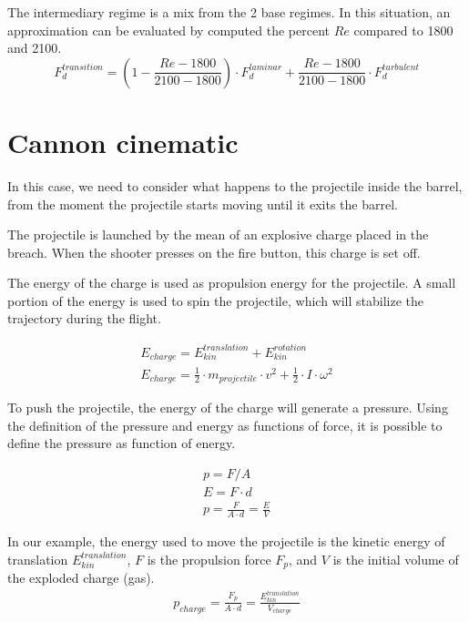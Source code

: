 \documentclass[12pt,a4paper]{article}
\begin{document}
The intermediary regime is a mix from the 2 base regimes. In this situation, an approximation can be evaluated by computed the percent $Re$ compared to 1800 and 2100. 
\begin{equation}
	F_d^{transition} = (1- \frac{Re - 1800}{2100-1800}) \cdot F_d^{laminar} + \frac{Re - 1800}{2100-1800} \cdot F_d^{turbulent}
\end{equation}

\section{Cannon cinematic}
In this case, we need to consider what happens to the projectile inside the barrel, from the moment the projectile starts moving until it exits the barrel. 

The projectile is launched by the mean of an explosive charge placed in the breach. 
When the shooter presses on the fire button, this charge is set off. 

The energy of the charge is used as propulsion energy for the projectile. A small portion of the energy is used to spin the projectile, which will stabilize the trajectory during the flight. 

\begin{eqnarray}
	E_{charge} = E_{kin}^{translation} + E_{kin}^{rotation} \\
	E_{charge} = \frac{1}{2} \cdot m_{projectile} \cdot v^2 + \frac{1}{2} \cdot I \cdot \omega ^ 2
\end{eqnarray}

To push the projectile, the energy of the charge will generate a pressure. Using the definition of the pressure and energy as functions of force, it is possible to define the pressure as function of energy. 

\begin{eqnarray}
	p = F/A \\
	E = F \cdot d \\
	p = \frac{F}{A \cdot d} = \frac{E}{V}
\end{eqnarray}

In our example, the energy used to move the projectile is the kinetic energy of translation $E_{kin}^{translation}$, $F$ is the propulsion force $F_p$, and $V$ is the initial volume of the exploded charge (gas).
\begin{eqnarray}
	p_{charge} = \frac{F_p}{A \cdot d} = \frac{E_{kin}^{translation}}{V_{charge}}
\end{eqnarray}
\end{document}

